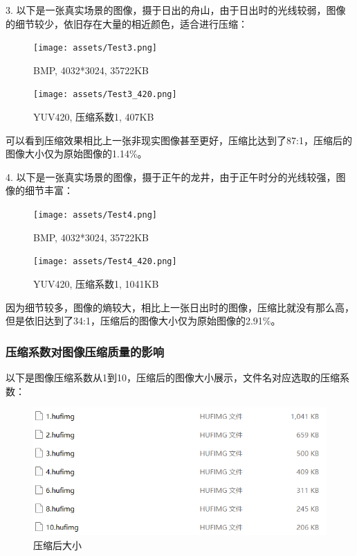 \documentclass{article}
\begin{document}
3. 以下是一张真实场景的图像，摄于日出的舟山，由于日出时的光线较弱，图像的细节较少，依旧存在大量的相近颜色，适合进行压缩：
\FloatBarrier
\begin{figure}[htbp]
    \centering
    \begin{minipage}[t]{0.45\textwidth}
        \centering
        \texttt{[image: assets/Test3.png]}
        \caption{BMP, 4032*3024, 35722KB}
    \end{minipage}
    \hfill  %
    \begin{minipage}[t]{0.45\textwidth}
        \centering
        \texttt{[image: assets/Test3\_420.png]}
        \caption{YUV420, 压缩系数1, 407KB}
    \end{minipage}
\end{figure}
\FloatBarrier
可以看到压缩效果相比上一张非现实图像甚至更好，压缩比达到了87:1，压缩后的图像大小仅为原始图像的1.14\%。

4. 以下是一张真实场景的图像，摄于正午的龙井，由于正午时分的光线较强，图像的细节丰富：
\FloatBarrier
\begin{figure}[htbp]
    \centering
    \begin{minipage}[t]{0.45\textwidth}
        \centering
        \texttt{[image: assets/Test4.png]}
        \caption{BMP, 4032*3024, 35722KB}
    \end{minipage}
    \hfill  %
    \begin{minipage}[t]{0.45\textwidth}
        \centering
        \texttt{[image: assets/Test4\_420.png]}
        \caption{YUV420, 压缩系数1, 1041KB}
    \end{minipage}
\end{figure}
\FloatBarrier
因为细节较多，图像的熵较大，相比上一张日出时的图像，压缩比就没有那么高，但是依旧达到了34:1，压缩后的图像大小仅为原始图像的2.91\%。

\subsubsection{压缩系数对图像压缩质量的影响}

以下是图像压缩系数从1到10，压缩后的图像大小展示，文件名对应选取的压缩系数：

\FloatBarrier
\begin{figure}[htbp]
    \centering
    \begin{minipage}[t]{0.45\textwidth}
        \centering
        \includegraphics[width=\textwidth]{assets/compare.png}
        \caption{压缩后大小}
    \end{minipage}
\end{figure}
\FloatBarrier
\end{document}
